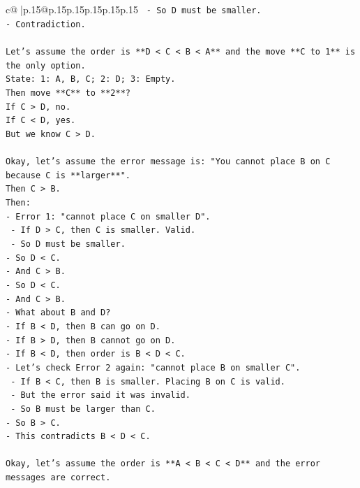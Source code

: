 \documentclass{article}
\begin{document}
{\begin{supertabular}{c@{$\;$}|p{.15\linewidth}@{}p{.15\linewidth}p{.15\linewidth}p{.15\linewidth}p{.15\linewidth}p{.15\linewidth}}
{{{\texttt{    {-} So D must be smaller.} \\
\texttt{{-} Contradiction.} \\
\\ 
\texttt{Let's assume the order is **D < C < B < A** and the move **C to 1** is the only option.} \\
\texttt{State: 1: A, B, C; 2: D; 3: Empty.} \\
\texttt{Then move **C** to **2**?} \\
\texttt{If C > D, no.} \\
\texttt{If C < D, yes.} \\
\texttt{But we know C > D.} \\
\\ 
\texttt{Okay, let's assume the error message is: "You cannot place B on C because C is **larger**".} \\
\texttt{Then C > B.} \\
\texttt{Then:} \\
\texttt{{-} Error 1: "cannot place C on smaller D".} \\
\texttt{    {-} If D > C, then C is smaller. Valid.} \\
\texttt{    {-} So D must be smaller.} \\
\texttt{{-} So D < C.} \\
\texttt{{-} And C > B.} \\
\texttt{{-} So D < C.} \\
\texttt{{-} And C > B.} \\
\texttt{{-} What about B and D?} \\
\texttt{{-} If B < D, then B can go on D.} \\
\texttt{{-} If B > D, then B cannot go on D.} \\
\texttt{{-} If B < D, then order is B < D < C.} \\
\texttt{{-} Let's check Error 2 again: "cannot place B on smaller C".} \\
\texttt{    {-} If B < C, then B is smaller. Placing B on C is valid.} \\
\texttt{    {-} But the error said it was invalid.} \\
\texttt{    {-} So B must be larger than C.} \\
\texttt{{-} So B > C.} \\
\texttt{{-} This contradicts B < D < C.} \\
\\ 
\texttt{Okay, let's assume the order is **A < B < C < D** and the error messages are correct.} \\
}}}
\end{supertabular}}
\end{document}
